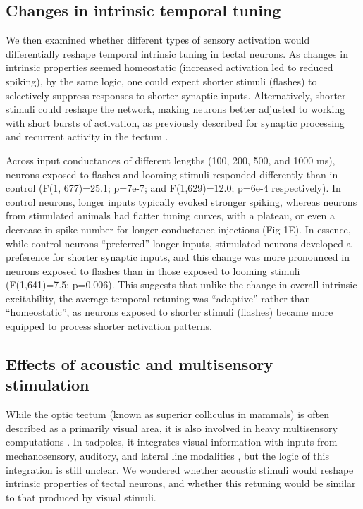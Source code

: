 \documentclass{article}
\begin{document}
\subsection*{Changes in intrinsic temporal tuning}

We then examined whether different types of sensory activation would differentially reshape temporal intrinsic tuning in tectal neurons. As changes in intrinsic properties seemed homeostatic (increased activation led to reduced spiking), by the same logic, one could expect shorter stimuli (flashes) to selectively suppress responses to shorter synaptic inputs. Alternatively, shorter stimuli could reshape the network, making neurons better adjusted to working with short bursts of activation, as  previously described for synaptic processing \citep{aizenman2007} and recurrent activity in the tectum \citep{pratt2007,shen2011}.

Across input conductances of different lengths (100, 200, 500, and 1000 ms), neurons exposed to flashes and looming stimuli responded differently than in control (F(1, 677)=25.1; p=7e-7; and F(1,629)=12.0; p=6e-4 respectively). In control neurons, longer inputs typically evoked stronger spiking, whereas neurons from stimulated animals had flatter tuning curves, with a plateau, or even a decrease in spike number for longer conductance injections (Fig 1E). In essence, while control neurons “preferred” longer inputs, stimulated neurons developed a preference for shorter synaptic inputs, and this change was more pronounced in neurons exposed to flashes than in those exposed to looming stimuli (F(1,641)=7.5; p=0.006). This suggests that unlike the  change in overall intrinsic excitability, the average temporal retuning was “adaptive” rather than “homeostatic”, as neurons exposed to shorter stimuli (flashes) became more equipped to process shorter activation patterns. 

\subsection*{Effects of acoustic and multisensory stimulation}

While the optic tectum (known as superior colliculus in mammals) is often described as a primarily visual area, it is also involved in heavy multisensory computations \citep{stein2014}. In tadpoles, it integrates visual information with inputs from mechanosensory, auditory, and lateral line modalities \citep{deeg2009,pratt2009,hiramoto2009,felch2016,truszkowski2017}, but the logic of this integration is still unclear. We wondered whether acoustic stimuli would reshape intrinsic properties of tectal neurons, and whether this retuning would be similar to that produced by visual stimuli. 
\end{document}
